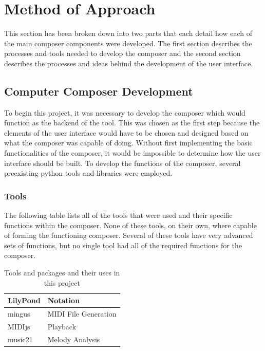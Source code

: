 \chapter{Method of Approach} 
\label{ch:methodofapproach}

This section has been broken down into two parts that each detail how each of the main composer components were developed.  The first section describes the processes and tools needed to develop the composer and the second section describes the processes and ideas behind the development of the user interface.

\section{Computer Composer Development}
\label{sec:computercomposerdevelopment}

To begin this project, it was necessary to develop the composer which would function as the backend of the tool.  This was chosen as the first step because the elements of the user interface would have to be chosen and designed based on what the composer was capable of doing.  Without first implementing the basic functionalities of the composer, it would be impossible to determine how the user interface should be built.  To develop the functions of the composer, several preexisting python tools and libraries were employed.

\vspace{\baselineskip}

\subsection{Tools}
\label{subsec:tools}

The following table lists all of the tools that were used and their specific functions within the composer.  None of these tools, on their own, where capable of forming the functioning composer.  Several of these tools have very advanced sets of functions, but no single tool had all of the required functions for the composer.

\begin{table}[!htbp]
	\centering
	\caption{Tools and packages and their uses in this project}
	\begin{tabular}{|l|l|}
		\hline
		LilyPond & Notation \\ \hline
		mingus & MIDI File Generation \\ \hline
		MIDIjs & Playback \\ \hline
		music21 & Melody Analysis \\ \hline
	\end{tabular}
\end{table}

